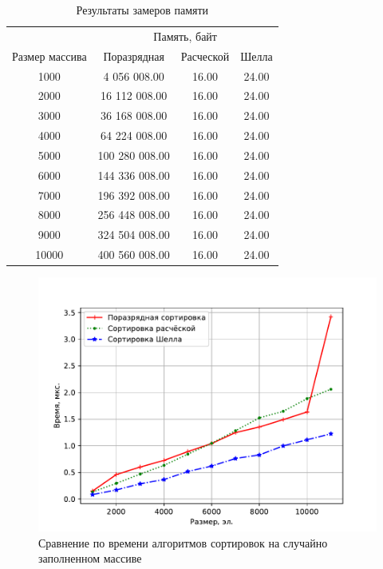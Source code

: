 \begin{table}[h!]
    \caption{Результаты замеров памяти}
    \label{tbl:mem_rand}
	\centering
		\begin{tabular}{|c|c|c|c|}
			\hline
			& \multicolumn{3}{c|}{Память, байт} \\ \cline{2-4}
			Размер массива & Поразрядная & Расческой & Шелла 
			\\
			\hline
			1000 & 4 056 008.00 & 16.00 & 24.00 \\
			\hline
			2000 & 16 112 008.00 & 16.00 & 24.00 \\ 
			\hline
			3000 & 36 168 008.00 & 16.00 & 24.00 \\ 
			\hline
			4000 & 64 224 008.00 & 16.00 & 24.00 \\ 
			\hline
			5000 & 100 280 008.00 & 16.00 & 24.00 \\ 
			\hline
			6000 & 144 336 008.00 & 16.00 & 24.00 \\ 
			\hline
			7000 & 196 392 008.00 & 16.00 & 24.00 \\ 
			\hline
			8000 & 256 448 008.00 & 16.00 & 24.00 \\ 
			\hline
			9000 & 324 504 008.00 & 16.00 & 24.00 \\ 
			\hline
			10000 & 400 560 008.00 & 16.00 & 24.00 \\
			\hline

		\end{tabular}
\end{table}

\begin{figure}[H]
	\centering
	\includegraphics[height=0.4\textheight, page=4]{img/figures.pdf}
	\caption{Сравнение по времени алгоритмов сортировок на случайно заполненном массиве}
	\label{plt:time_04}
\end{figure}

